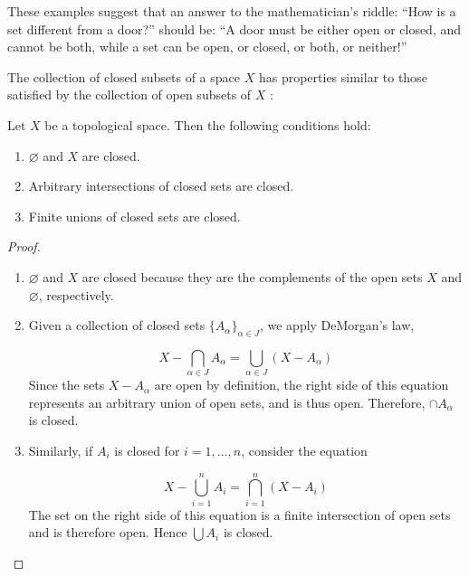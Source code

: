 These examples suggest that an answer to the mathematician's riddle: ``How is a set different from a door?'' should be: ``A door must be either open or closed, and cannot be both, while a set can be open, or closed, or both, or neither!''

The collection of closed subsets of a space \(X\) has properties similar to those satisfied by the collection of open subsets of \(X\) :

\begin{theorem}
\label{thm:\thetheorem}
 Let \(X\) be a topological space. Then the following conditions hold:

 \begin{enumerate}[itemsep=0.2em, parsep=0pt, topsep=0pt, partopsep=0pt, leftmargin=*, label=(\arabic*), align=left]
 \item \(\varnothing\) and \(X\) are closed.
 \item Arbitrary intersections of closed sets are closed.
 \item Finite unions of closed sets are closed.
 \end{enumerate}
\end{theorem}

\begin{proof}
 \begin{enumerate}[itemsep=0.2em, parsep=0pt, topsep=0pt, partopsep=0pt, leftmargin=*, label=(\arabic*), align=left]
 \item \(\varnothing\) and \(X\) are closed because they are the complements of the open sets \(X\) and \(\varnothing\), respectively.

\item Given a collection of closed sets \({\{ A_{\alpha }\} }_{\alpha \in J}\), we apply DeMorgan's law,

 \[
 X - \mathop{\bigcap }\limits_{{\alpha \in J}}A_{\alpha } = \mathop{\bigcup }\limits_{{\alpha \in J}}( {X - A_{\alpha }})
 \]
 Since the sets \(X - A_{\alpha }\) are open by definition, the right side of this equation represents an arbitrary union of open sets, and is thus open. Therefore, \(\cap {A}_{\alpha }\) is closed.

 \item Similarly, if \(A_{i}\) is closed for \(i = 1,\ldots,n\), consider the equation

 \[
 X - \mathop{\bigcup }\limits_{{i = 1}}^{n}A_{i} = \mathop{\bigcap }\limits_{{i = 1}}^{n}( {X - A_{i}})
 \]
 The set on the right side of this equation is a finite intersection of open sets and is therefore open. Hence \(\bigcup {A}_{i}\) is closed.
 \end{enumerate}
\end{proof}

